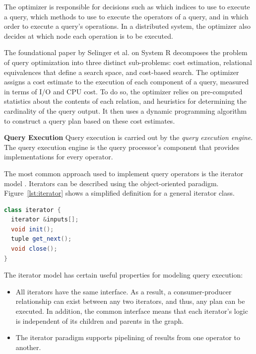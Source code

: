 The optimizer is responsible for decisions such as which indices to use to execute a query,
which methods to use to execute the operators of a query,
and in which order to execute a query's operations.
In a distributed system, the optimizer also decides at which node each operation is to be executed.

The foundational paper by Selinger et al. on System R \cite{selinger:systemr} decomposes the problem of query optimization
into three distinct sub-problems: cost estimation, relational equivalences that define a search space, and cost-based
search.
The optimizer assigns a cost estimate to the execution of each component of a query, measured in terms of I/O and CPU
cost.
To do so, the optimizer relies on pre-computed statistics about the contents of each relation, and heuristics for
determining the cardinality of the query output.
It then uses a dynamic programming algorithm to construct a query plan based on these cost estimates.

\bigskip
\noindent
\textbf{Query Execution}
Query execution is carried out by the \textit{query execution engine}.
The query execution engine is the query processor's component that provides implementations for every operator.

The most common approach used to implement query operators is the iterator model \cite{graefe:queryevaluation}.
Iterators can be described using the object-oriented paradigm.
Figure~\ref{lst:iterator} shows a simplified definition for a general iterator class.

\begin{lstlisting}[caption={Iterator class pseudocode \cite{hellerstein:databasearchitecture}},label={lst:iterator},captionpos=b,language=Java]
class iterator {
  iterator &inputs[];
  void init();
  tuple get_next();
  void close();
}
\end{lstlisting}

The iterator model has certain useful properties for modeling query execution:
\begin{itemize}

  \item All iterators have the same interface.
  As a result, a consumer-producer relationship can exist between any two iterators, and thus, any plan can be executed.
  In addition, the common interface means that each iterator's logic is independent of its children and parents in the
  graph.

  \item Τhe iterator paradigm supports pipelining of results from one operator to another.

\end{itemize}

